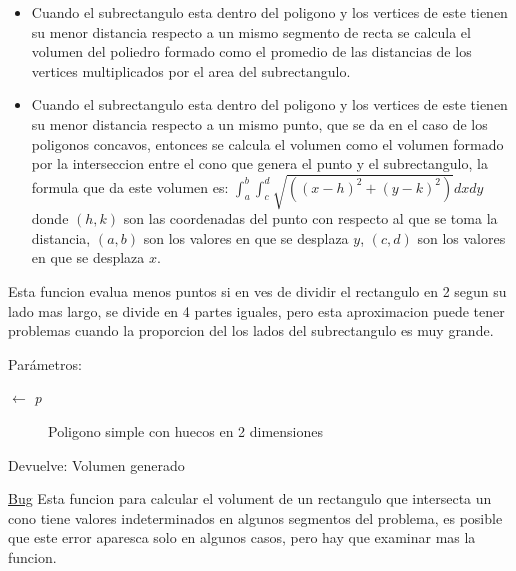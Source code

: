\begin{itemize}
\item Cuando el subrectangulo esta dentro del poligono y los vertices de este tienen su menor distancia respecto a un mismo segmento de recta se calcula el volumen del poliedro formado como el promedio de las distancias de los vertices multiplicados por el area del subrectangulo.\end{itemize}


\begin{itemize}
\item Cuando el subrectangulo esta dentro del poligono y los vertices de este tienen su menor distancia respecto a un mismo punto, que se da en el caso de los poligonos concavos, entonces se calcula el volumen como el volumen formado por la interseccion entre el cono que genera el punto y el subrectangulo, la formula que da este volumen es: $\int_{a}^{b}\int_{c}^{d}\sqrt{((x-h)^2 + (y-k)^2)} dx dy$ donde $(h,k)$ son las coordenadas del punto con respecto al que se toma la distancia, $(a,b)$ son los valores en que se desplaza $y$, $(c,d)$ son los valores en que se desplaza $x$.\end{itemize}


Esta funcion evalua menos puntos si en ves de dividir el rectangulo en 2 segun su lado mas largo, se divide en 4 partes iguales, pero esta aproximacion puede tener problemas cuando la proporcion del los lados del subrectangulo es muy grande.

\begin{Desc}
\item[Par\'{a}metros:]
\begin{description}
\item[\mbox{$\leftarrow$} {\em p}]Poligono simple con huecos en 2 dimensiones \end{description}
\end{Desc}
\begin{Desc}
\item[Devuelve:]Volumen generado \end{Desc}


\begin{Desc}
\item[\hyperlink{bug__bug000001}{Bug}]Esta funcion para calcular el volument de un rectangulo que intersecta un cono tiene valores indeterminados en algunos segmentos del problema, es posible que este error aparesca solo en algunos casos, pero hay que examinar mas la funcion. \end{Desc}



